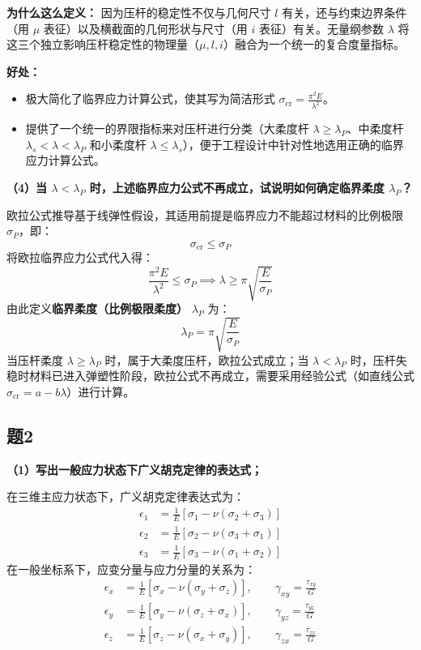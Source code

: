 \documentclass[11pt,a4paper]{ctexrep}
\begin{document}
{\textbf{为什么这么定义：}
因为压杆的稳定性不仅与几何尺寸 $l$ 有关，还与约束边界条件（用 $\mu$ 表征）以及横截面的几何形状与尺寸（用 $i$ 表征）有关。无量纲参数 $\lambda$ 将这三个独立影响压杆稳定性的物理量（$\mu, l, i$）融合为一个统一的复合度量指标。

\textbf{好处：}
\begin{itemize}
    \item 极大简化了临界应力计算公式，使其写为简洁形式 $\sigma_{\text{cr}} = \frac{\pi^2 E}{\lambda^2}$。
    \item 提供了一个统一的界限指标来对压杆进行分类（大柔度杆 $\lambda \ge \lambda_P$、中柔度杆 $\lambda_s < \lambda < \lambda_P$ 和小柔度杆 $\lambda \le \lambda_s$），便于工程设计中针对性地选用正确的临界应力计算公式。
\end{itemize}

\textbf{（4）当 $\lambda < \lambda_P$ 时，上述临界应力公式不再成立，试说明如何确定临界柔度 $\lambda_P$？}

欧拉公式推导基于线弹性假设，其适用前提是临界应力不能超过材料的比例极限 $\sigma_P$，即：
\[
    \sigma_{\text{cr}} \le \sigma_P
\]
将欧拉临界应力公式代入得：
\[
    \frac{\pi^2 E}{\lambda^2} \le \sigma_P \implies \lambda \ge \pi \sqrt{\frac{E}{\sigma_P}}
\]
由此定义\textbf{临界柔度（比例极限柔度）} $\lambda_P$ 为：
\[
    \lambda_P = \pi \sqrt{\frac{E}{\sigma_P}}
\]
当压杆柔度 $\lambda \ge \lambda_P$ 时，属于大柔度压杆，欧拉公式成立；当 $\lambda < \lambda_P$ 时，压杆失稳时材料已进入弹塑性阶段，欧拉公式不再成立，需要采用经验公式（如直线公式 $\sigma_{\text{cr}} = a - b\lambda$）进行计算。

\subsection*{题2}
\textbf{（1）写出一般应力状态下广义胡克定律的表达式；}

在三维主应力状态下，广义胡克定律表达式为：
\[
    \begin{aligned}
        \epsilon_1 &= \frac{1}{E} \left[ \sigma_1 - \nu (\sigma_2 + \sigma_3) \right] \\
        \epsilon_2 &= \frac{1}{E} \left[ \sigma_2 - \nu (\sigma_3 + \sigma_1) \right] \\
        \epsilon_3 &= \frac{1}{E} \left[ \sigma_3 - \nu (\sigma_1 + \sigma_2) \right]
    \end{aligned}
\]
在一般坐标系下，应变分量与应力分量的关系为：
\[
    \begin{aligned}
        \epsilon_x &= \frac{1}{E} \left[ \sigma_x - \nu (\sigma_y + \sigma_z) \right], \qquad \gamma_{xy} = \frac{\tau_{xy}}{G} \\
        \epsilon_y &= \frac{1}{E} \left[ \sigma_y - \nu (\sigma_z + \sigma_x) \right], \qquad \gamma_{yz} = \frac{\tau_{yz}}{G} \\
        \epsilon_z &= \frac{1}{E} \left[ \sigma_z - \nu (\sigma_x + \sigma_y) \right], \qquad \gamma_{zx} = \frac{\tau_{zx}}{G}
    \end{aligned}
\]

}
\end{document}
